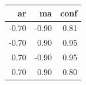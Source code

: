\begin{table}[ht]
\centering
\begin{tabular}{rrr}
  \hline
ar & ma & conf \\ 
  \hline
-0.70 & -0.90 & 0.81 \\ 
  -0.70 & 0.90 & 0.95 \\ 
  0.70 & -0.90 & 0.95 \\ 
  0.70 & 0.90 & 0.80 \\ 
   \hline
\end{tabular}
\end{table}

